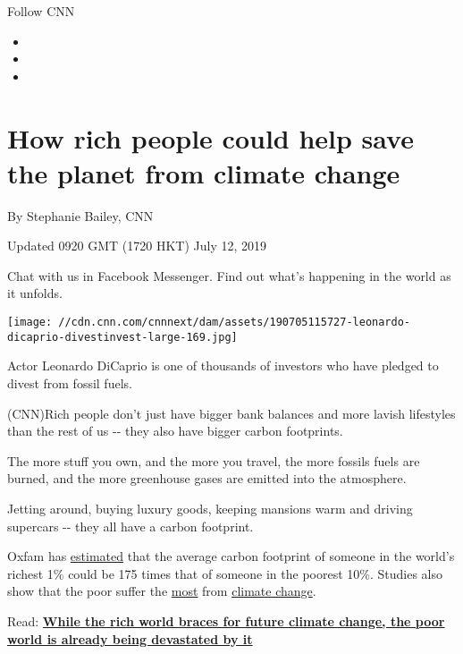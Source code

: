 Follow CNN

\begin{itemize}
\item
\item
\item
\end{itemize}

\hypertarget{how-rich-people-could-help-save-the-planet-from-climate-change}{%
\section{How rich people could help save the planet from climate
change}\label{how-rich-people-could-help-save-the-planet-from-climate-change}}

By Stephanie Bailey, CNN

Updated 0920 GMT (1720 HKT) July 12, 2019

Chat with us in Facebook Messenger. Find out what's happening in the
world as it unfolds.

\texttt{[image: //cdn.cnn.com/cnnnext/dam/assets/190705115727-leonardo-dicaprio-divestinvest-large-169.jpg]}

Actor Leonardo DiCaprio is one of thousands of investors who have
pledged to divest from fossil fuels.

(CNN)Rich people don't just have bigger bank balances and more lavish
lifestyles than the rest of us -\/- they also have bigger carbon
footprints.

The more stuff you own, and the more you travel, the more fossils fuels
are burned, and the more greenhouse gases are emitted into the
atmosphere.

Jetting around, buying luxury goods, keeping mansions warm and driving
supercars -\/- they all have a carbon footprint.

Oxfam has
\href{https://www.oxfam.org/sites/www.oxfam.org/files/file_attachments/mb-extreme-carbon-inequality-021215-en.pdf?cid=aff_affwd_donate_id78888\&awc=5991_1558106971_e9c67e275814af69c365ae4eb8875943}{estimated}
that the average carbon footprint of someone in the world's richest 1\%
could be 175 times that of someone in the poorest 10\%. Studies also
show that the poor suffer the
\href{https://edition.cnn.com/2019/03/31/africa/poorest-hit-the-hardest-climate-change-mozambique-intl/index.html}{most}
from \href{https://www.cnn.com/specials/world/cnn-climate}{climate
change}.

Read:
\href{https://www.preview.cnn.com/2019/03/31/africa/poorest-hit-the-hardest-climate-change-mozambique-intl/index.html}{\textbf{While
the rich world braces for future climate change, the poor world is
already being devastated by it}}

